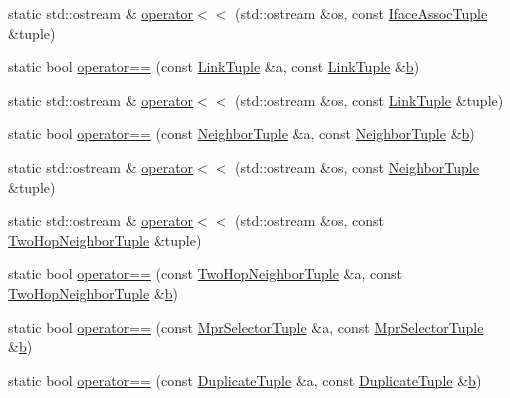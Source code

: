 \begin{DoxyCompactItemize}
\item 
static std\+::ostream \& \hyperlink{namespacens3_1_1olsr_a9fe8aa9ca65b2245c36856abe3b8a53c}{operator$<$$<$} (std\+::ostream \&os, const \hyperlink{structns3_1_1olsr_1_1IfaceAssocTuple}{Iface\+Assoc\+Tuple} \&tuple)
\item 
static bool \hyperlink{namespacens3_1_1olsr_abf9f5af36c1702b754ece97866f200fb}{operator==} (const \hyperlink{structns3_1_1olsr_1_1LinkTuple}{Link\+Tuple} \&a, const \hyperlink{structns3_1_1olsr_1_1LinkTuple}{Link\+Tuple} \&\hyperlink{lte__pathloss_8m_a21ad0bd836b90d08f4cf640b4c298e7c}{b})
\item 
static std\+::ostream \& \hyperlink{namespacens3_1_1olsr_a4d56e7c9cda66941b5696bf6d9036621}{operator$<$$<$} (std\+::ostream \&os, const \hyperlink{structns3_1_1olsr_1_1LinkTuple}{Link\+Tuple} \&tuple)
\item 
static bool \hyperlink{namespacens3_1_1olsr_ac6f94963744482d449b4acc4c87d0a58}{operator==} (const \hyperlink{structns3_1_1olsr_1_1NeighborTuple}{Neighbor\+Tuple} \&a, const \hyperlink{structns3_1_1olsr_1_1NeighborTuple}{Neighbor\+Tuple} \&\hyperlink{lte__pathloss_8m_a21ad0bd836b90d08f4cf640b4c298e7c}{b})
\item 
static std\+::ostream \& \hyperlink{namespacens3_1_1olsr_a9c3b1f93f73d25fe1fdc3f19553a0026}{operator$<$$<$} (std\+::ostream \&os, const \hyperlink{structns3_1_1olsr_1_1NeighborTuple}{Neighbor\+Tuple} \&tuple)
\item 
static std\+::ostream \& \hyperlink{namespacens3_1_1olsr_ac745de55388f207ace0c62be3db18d88}{operator$<$$<$} (std\+::ostream \&os, const \hyperlink{structns3_1_1olsr_1_1TwoHopNeighborTuple}{Two\+Hop\+Neighbor\+Tuple} \&tuple)
\item 
static bool \hyperlink{namespacens3_1_1olsr_a27c065b59dabb85e4b3428c1ce9005d7}{operator==} (const \hyperlink{structns3_1_1olsr_1_1TwoHopNeighborTuple}{Two\+Hop\+Neighbor\+Tuple} \&a, const \hyperlink{structns3_1_1olsr_1_1TwoHopNeighborTuple}{Two\+Hop\+Neighbor\+Tuple} \&\hyperlink{lte__pathloss_8m_a21ad0bd836b90d08f4cf640b4c298e7c}{b})
\item 
static bool \hyperlink{namespacens3_1_1olsr_abb92e9c3a66270c623a7f77a46b3bc19}{operator==} (const \hyperlink{structns3_1_1olsr_1_1MprSelectorTuple}{Mpr\+Selector\+Tuple} \&a, const \hyperlink{structns3_1_1olsr_1_1MprSelectorTuple}{Mpr\+Selector\+Tuple} \&\hyperlink{lte__pathloss_8m_a21ad0bd836b90d08f4cf640b4c298e7c}{b})
\item 
static bool \hyperlink{namespacens3_1_1olsr_a338ddd99bfa3f17a76abdfd6fa9d1185}{operator==} (const \hyperlink{structns3_1_1olsr_1_1DuplicateTuple}{Duplicate\+Tuple} \&a, const \hyperlink{structns3_1_1olsr_1_1DuplicateTuple}{Duplicate\+Tuple} \&\hyperlink{lte__pathloss_8m_a21ad0bd836b90d08f4cf640b4c298e7c}{b})

\end{DoxyCompactItemize}
